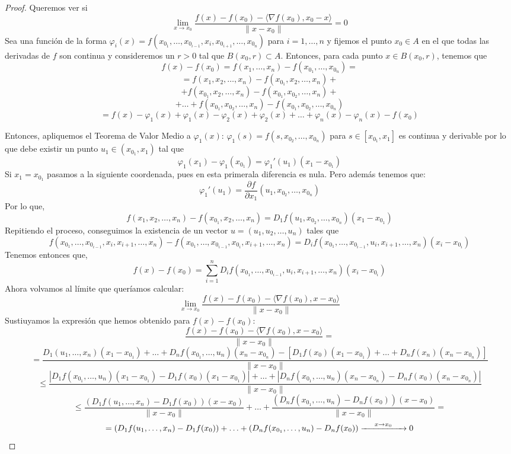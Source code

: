 \begin{proof}
    Queremos ver si $$ \lim_{x \to x_0} \frac{f(x) - f(x_0) - \langle \nabla f(x_0), x_0 - x \rangle}{\|x - x_0\|} = 0 $$
    Sea una función de la forma $\varphi_i(x) = f(x_{0_1}, \ldots, x_{0_{i-1}}, x_i, x_{0_{i+1}}, \ldots, x_{0_n})$ para $i = 1, \ldots, n$ y fijemos el punto $x_0 \in A$ en el que todas las derivadas de $f$ son continua y consideremos un $r > 0$ tal que $B(x_0, r) \subset A$. Entonces, para cada punto $x \in B(x_0, r)$, tenemos que
    $$f(x) - f(x_0) = f(x_1, \ldots, x_n) - f(x_{0_1}, \ldots, x_{0_n}) = $$
    $$ = f(x_1, x_2, \ldots, x_n) - f(x_{0_1}, x_2, \ldots, x_n) + $$ $$ + f(x_{0_1}, x_2, \ldots, x_n) - f(x_{0_1}, x_{0_2}, \ldots, x_n) + $$ $$+ \ldots + f(x_{0_1}, x_{0_2}, \ldots, x_n) - f(x_{0_1}, x_{0_2}, \ldots, x_{0_n})$$ $$ = f(x) - \varphi_1(x) + \varphi_1(x) - \varphi_2(x) + \varphi_2(x) + \ldots + \varphi_{n}(x) - \varphi_n(x) - f(x_0)$$

    Entonces, apliquemos el Teorema de Valor Medio a $\varphi_1(x)$: $\varphi_1(s) = f(s, x_{0_2}, \ldots, x_{0_n})$ para $s \in [x_{0_1}, x_1]$ es continua y derivable por lo que debe existir un punto $u_1 \in (x_{0_1}, x_1)$ tal que
    $$\varphi_1(x_1) - \varphi_1(x_{0_1}) = \varphi_1'(u_1)(x_1 - x_{0_1})$$
    Si $x_1 = x_{0_1}$ pasamos a la siguiente coordenada, pues en esta primerala diferencia es nula. 
    Pero además tenemos que:
    $$\varphi_1'(u_1) = \frac{\partial f}{\partial x_1}(u_1, x_{0_2}, \ldots, x_{0_n})$$
    Por lo que,
    $$f(x_1, x_2, \ldots,x_n) - f(x_{0_1}, x_2, \ldots, x_n) = D_1f(u_1, x_{0_2}, \ldots, x_{0_n})(x_1 - x_{0_1})$$
    Repitiendo el proceso, conseguimos la existencia de un vector $u = (u_1, u_2, \ldots, u_n)$ tales que 
    $$f(x_{0_1}, \ldots, x_{0_{i-1}}, x_i, x_{i+1}, \ldots, x_n) - f(x_{0_1}, \ldots, x_{0_{i-1}}, x_{0_i}, x_{i+1}, \ldots, x_n) = D_if(x_{0_1}, \ldots, x_{0_{i-1}}, u_i,x_{i+1}, \ldots, x_n)(x_i - x_{0_i})$$
    Tenemos entonces que, 
    $$f(x) - f(x_0) = \sum_{i = 1}^{n} D_if(x_{0_1}, \ldots, x_{0_{i-1}}, u_i,x_{i+1}, \ldots, x_n)(x_i - x_{0_i})$$
    Ahora volvamos al límite que queríamos calcular:
    $$ \lim_{x \to x_0} \frac{f(x) - f(x_0) - \langle \nabla f(x_0), x - x_0 \rangle}{\|x - x_0\|}$$
    Sustiuyamos la expresión que hemos obtenido para $f(x) - f(x_0)$:
    $$ \frac{f(x) - f(x_0) - \langle \nabla f(x_0), x - x_0 \rangle}{\|x - x_0\|} = $$ 
    $$ = \frac{D_1(u_1, \ldots, x_n)(x_1 - x_{0_1}) + \ldots + D_{n}f(x_{0_1}, \ldots, u_n)(x_n - x_{0_n}) - [ D_1f(x_0)(x_1-x_{0_1}) + \ldots + D_nf(x_n)(x_n - x_{0_n})]}{\|x - x_0\|} $$
    $$ \leq \frac{|D_1f(x_{0_1}, \ldots, u_n)(x_1 - x_{0_1}) - D_1f(x_0)(x_1-x_{0_1})| + \ldots + |D_nf(x_{0_1}, \ldots, u_n)(x_n - x_{0_n}) - D_nf(x_0)(x_n - x_{0_n})|}{\|x - x_0\|}$$
    $$ \leq \frac{(D_1f(u_1, \ldots, x_n) - D_1f(x_0))(x - x_0)}{\|x - x_0\|} + \ldots + \frac{(D_nf(x_{0_1}, \ldots, u_n) - D_nf(x_0))(x - x_0)}{\|x - x_0\|} = $$
    $$ = (D_1f(u_1, \ldots, x_n) - D_1f(x_0)) + \ldots + (D_nf(x_{0_1}, \ldots, u_n) - D_nf(x_0)) \xrightarrow{\hspace{0.5cm} x \to x_0 \hspace{0.5cm}} 0$$
\end{proof}

